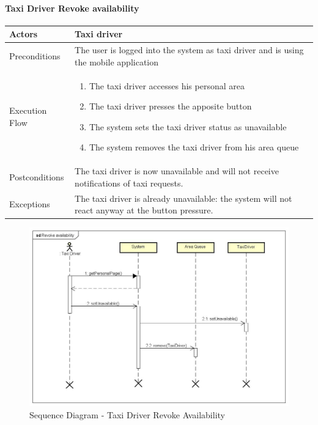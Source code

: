 \paragraph{Taxi Driver Revoke availability}
\begin{center}
	\begin{tabular}{ | l | p{8cm} |}
		\hline Actors & Taxi driver
		\\ \hline
		Preconditions &
		The user is logged into the system as taxi driver and is using the mobile application
		\\ \hline
		Execution Flow &
		\begin{enumerate}
			\item The taxi driver accesses his personal area
			\item The taxi driver presses the apposite button
			\item The system sets the taxi driver status as unavailable
			\item The system removes the taxi driver from his area queue
		\end{enumerate}
		\\ \hline
		Postconditions & 
		The taxi driver is now unavailable and will not receive notifications of taxi requests.
		\\ \hline
		Exceptions &
		The taxi driver is already unavailable: the system will not react anyway at the button
		pressure.
		\\ \hline
	\end{tabular}
\end{center}
\newpage
\begin{landscape}
\begin{figure}[!h]
	\begin{center}			
		\includegraphics[height=\textheight]{../SE2_SD/RevokeAvailability}
		\caption{Sequence Diagram - Taxi Driver Revoke Availability}	
	\end{center}
\end{figure}
\end{landscape}
\newpage
